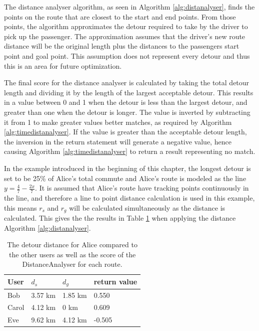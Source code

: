 The distance analyser algorithm, as seen in Algorithm \ref{alg:distanalyser}, finds the points on the route that are closest to the start and end points.
From those points, the algorithm approximates the detour required to take by the driver to pick up the passenger.
The approximation assumes that the driver's new route distance will be the original length plus the distances to the passengers start point and goal point.
This assumption does not represent every detour and thus this is an area for future optimization.

The final score for the distance analyser is calculated by taking the total detour length and dividing it by the length of the largest acceptable detour.
This results in a value between 0 and 1 when the detour is less than the largest detour, and greater than one when the detour is longer.
The value is inverted by subtracting it from 1 to make greater values better matches, as required by Algorithm \ref{alg:timedistanalyser}.
If the value is greater than the acceptable detour length, the inversion in the return statement will generate a negative value, hence causing Algorithm \ref{alg:timedistanalyser} to return a result representing no match.

In the example introduced in the beginning of this chapter, the longest detour is set to be 25\% of Alice's total commute and Alice's route is modeled as the line  $y = \frac{4}{7}-\frac{2 x}{7}$.
It is assumed that Alice's route have tracking points continuously in the line, and therefore a line to point distance calculation is used in this example, this means $r_s$ and $r_g$ will be calculated simultaneously as the distance is calculated.
This gives the the results \DIFdelbegin {}\DIFdelend \DIFaddbegin {}\DIFaddend in Table \ref{tbl:distance} when applying the distance  Algorithm \ref{alg:distanalyser}.

\begin{table}[!ht]
\centering
\begin{tabular}{@{}llll@{}}
\toprule
\textbf{User} 	& \textbf{$d_s$} & \textbf{$d_g$} 	& \textbf{return value} 	\\ \midrule
Bob         	& 3.57 km        & 1.85 km	    	& 0.550		 			\\
Carol         	& 4.12 km        & 0 km       		& 0.609        		\\
Eve           	& 9.62 km        & 4.12 km		    & -0.505        		\\ \bottomrule
\end{tabular}
\caption{The detour distance for Alice compared to the other users as well as the score of the DistanceAnalyser for each route.}
\label{tbl:distance}
\end{table}

